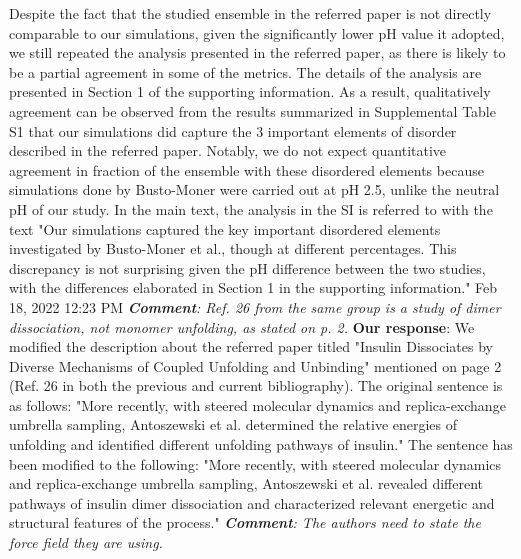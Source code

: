 \documentclass[9pt]{elife}
\begin{document}
Despite the fact that the studied ensemble in the referred paper is not directly comparable to our simulations, given the significantly lower pH value it adopted, we still repeated the analysis presented in the referred paper, as there is likely to be a partial agreement in some of the metrics. The details of the analysis are presented in Section 1 of the supporting information. As a result, qualitatively agreement can be observed from the results summarized in Supplemental Table S1 that our simulations did capture the 3 important elements of disorder described in the referred paper. Notably, we do not expect quantitative agreement in fraction of the ensemble with these disordered elements because simulations done by Busto-Moner were carried out at pH 2.5, unlike the neutral pH of our study.  In the main text, the analysis in the SI is referred to with the text "Our simulations captured the key important disordered elements investigated by Busto-Moner et al., though at different percentages. This discrepancy is not surprising given the pH difference between the two studies, with the differences elaborated in Section 1 in the supporting information."
Feb 18, 2022 12:23 PM
\newline
\newline
\indent
\textit{\textbf{Comment}: Ref. 26 from the same group is a study of dimer dissociation, not monomer unfolding, as stated on p. 2.}
\newline
\indent
\textbf{Our response}: We modified the description about the referred paper titled "Insulin Dissociates by Diverse Mechanisms of Coupled Unfolding and Unbinding" mentioned on page 2 (Ref. 26 in both the previous and current bibliography). The original sentence is as follows:
\newline
"More recently, with steered molecular dynamics and replica-exchange umbrella sampling, Antoszewski et al. determined the relative energies of unfolding and identified different unfolding pathways of insulin."
\newline
The sentence has been modified to the following:
\newline 
"More recently, with steered molecular dynamics and replica-exchange umbrella sampling, Antoszewski et al. revealed different pathways of insulin dimer dissociation and characterized relevant energetic and structural features of the process."
\newline 
\newline
\indent
\textit{\textbf{Comment}: The authors need to state the force field they are using.}
\end{document}
